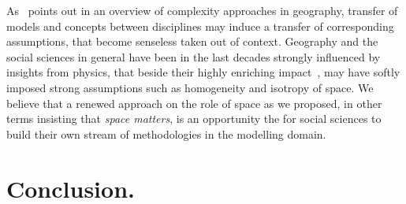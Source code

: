\documentclass[3p,times,procedia]{elsarticle}
\begin{document}
As~\citet{pumain2003approche} points out in an overview of complexity approaches in geography, transfer of models and concepts between disciplines may induce a transfer of corresponding assumptions, that become senseless taken out of context. Geography and the social sciences in general have been in the last decades strongly influenced by insights from physics, that beside their highly enriching impact~\citep{o2015physicists}, may have softly imposed strong assumptions such as homogeneity and isotropy of space. We believe that a renewed approach on the role of space as we proposed, in other terms insisting that \emph{space matters}, is an opportunity the for social sciences to build their own stream of methodologies in the modelling domain.




%
%
%
%
%
%



\section{Conclusion.}
\end{document}
